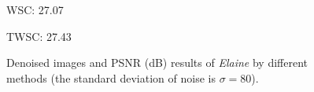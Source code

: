 \begin{figure}
\begin{adjustwidth}{-2cm}{}
{\begin{minipage}[t]{0.19\textwidth}
{\footnotesize WSC: 27.07}
\end{minipage}
\begin{minipage}[t]{0.19\textwidth}
\centering
{}
{\footnotesize TWSC: 27.43}
\end{minipage}
}
    \caption{Denoised images and PSNR (dB) results of \textsl{Elaine} by different methods (the standard deviation of noise is $\sigma=80$).}
    \label{fig5-5}
\end{adjustwidth}
\end{figure}

